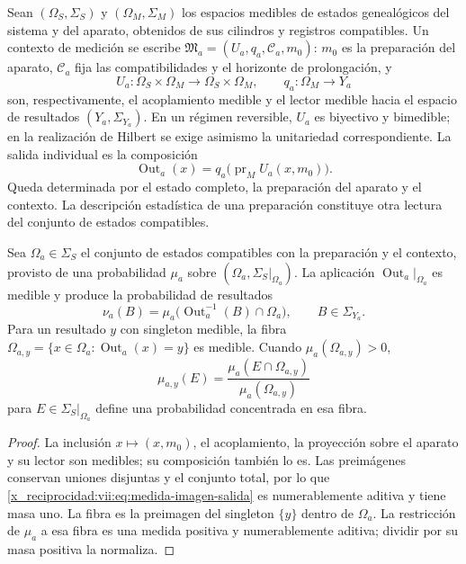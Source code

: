 Sean \((\Omega_S,\Sigma_S)\) y \((\Omega_M,\Sigma_M)\) los espacios
medibles de estados genealógicos del sistema y del aparato, obtenidos de
sus cilindros y registros compatibles. Un contexto de medición se escribe
\(\mathfrak M_a=(U_a,q_a,\mathcal C_a,m_0)\): \(m_0\) es la
preparación del aparato, \(\mathcal C_a\) fija las compatibilidades y el
horizonte de prolongación, y
\[
 U_a:\Omega_S\times\Omega_M\longrightarrow\Omega_S\times\Omega_M,
 \qquad q_a:\Omega_M\longrightarrow Y_a
\]
son, respectivamente, el acoplamiento medible y el lector medible hacia
el espacio de resultados \((Y_a,\Sigma_{Y_a})\). En un régimen reversible,
\(U_a\) es biyectivo y bimedible; en la realización de Hilbert se exige
asimismo la unitariedad correspondiente. La salida individual es la composición
\begin{equation}
 \operatorname{Out}_a(x)
 =q_a\bigl(\operatorname{pr}_M U_a(x,m_0)\bigr).
 \label{x_reciprocidad:vii:eq:out-genealogico}
\end{equation}
Queda determinada por el estado completo, la preparación del aparato y
el contexto. La descripción estadística de una preparación constituye
otra lectura del conjunto de estados compatibles.

\begin{proposition}
\label{x_reciprocidad:vii:prop:medida-salida}
Sea \(\Omega_a\in\Sigma_S\) el conjunto de estados compatibles con la
preparación y el contexto, provisto de una probabilidad \(\mu_a\) sobre
\((\Omega_a,\Sigma_S|_{\Omega_a})\).
La aplicación \(\operatorname{Out}_a|_{\Omega_a}\) es medible y produce
la probabilidad de resultados
\begin{equation}
 \nu_a(B)=\mu_a\bigl(\operatorname{Out}_a^{-1}(B)\cap\Omega_a\bigr),
 \qquad B\in\Sigma_{Y_a}.
 \label{x_reciprocidad:vii:eq:medida-imagen-salida}
\end{equation}
Para un resultado \(y\) con singleton medible, la fibra
\(\Omega_{a,y}=\{x\in\Omega_a:\operatorname{Out}_a(x)=y\}\)
es medible. Cuando \(\mu_a(\Omega_{a,y})>0\),
\begin{equation}
 \mu_{a,y}(E)=
 \frac{\mu_a(E\cap\Omega_{a,y})}{\mu_a(\Omega_{a,y})}
 \label{x_reciprocidad:vii:eq:condicionamiento-salida}
\end{equation}
para \(E\in\Sigma_S|_{\Omega_a}\) define una probabilidad concentrada
en esa fibra.
\end{proposition}
\begin{proof}
La inclusión \(x\mapsto(x,m_0)\), el acoplamiento, la proyección sobre
el aparato y su lector son medibles; su composición también lo es.
Las preimágenes conservan uniones disjuntas y el conjunto total, por lo
que \eqref{x_reciprocidad:vii:eq:medida-imagen-salida} es numerablemente aditiva y tiene
masa uno. La fibra es la preimagen del singleton \(\{y\}\) dentro de
\(\Omega_a\). La restricción de \(\mu_a\) a esa fibra es una medida
positiva y numerablemente aditiva; dividir por su masa positiva la normaliza.
\end{proof}

